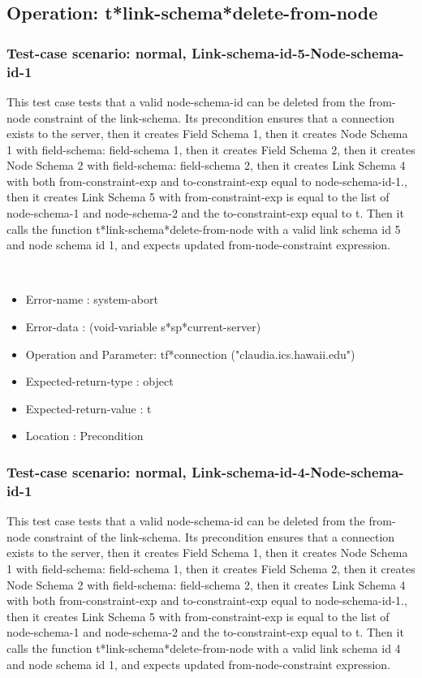 \subsection {Operation: t*link-schema*delete-from-node}
\subsubsection {Test-case scenario: normal, Link-schema-id-5-Node-schema-id-1}


This test case tests that a valid node-schema-id can be deleted from the from-node constraint of the link-schema.
Its precondition ensures that a connection exists to the server, then it creates Field Schema 1, then it creates Node Schema 1 with field-schema: field-schema 1, then it creates Field Schema 2, then it creates Node Schema 2 with field-schema: field-schema 2, then it creates Link Schema 4 with both  from-constraint-exp and to-constraint-exp equal to node-schema-id-1., then it creates Link Schema 5 with from-constraint-exp is equal to the list of node-schema-1 and node-schema-2 and the to-constraint-exp equal to t.
Then it calls the function t*link-schema*delete-from-node  with a valid link schema id 5 and node schema id 1, and expects updated from-node-constraint expression.



\
\begin {itemize}
\item 	Error-name             : system-abort
\item Error-data             : (void-variable s*sp*current-server)
\item Operation and Parameter: tf*connection ("claudia.ics.hawaii.edu")
\item Expected-return-type   : object
\item Expected-return-value  : t
\item Location               : Precondition



\end {itemize}
\subsubsection {Test-case scenario: normal, Link-schema-id-4-Node-schema-id-1}


This test case tests that a valid node-schema-id can be deleted from the from-node constraint of the link-schema.
Its precondition ensures that a connection exists to the server, then it creates Field Schema 1, then it creates Node Schema 1 with field-schema: field-schema 1, then it creates Field Schema 2, then it creates Node Schema 2 with field-schema: field-schema 2, then it creates Link Schema 4 with both  from-constraint-exp and to-constraint-exp equal to node-schema-id-1., then it creates Link Schema 5 with from-constraint-exp is equal to the list of node-schema-1 and node-schema-2 and the to-constraint-exp equal to t.
Then it calls the function t*link-schema*delete-from-node  with a valid link schema id 4 and node schema id 1, and expects updated from-node-constraint expression.



